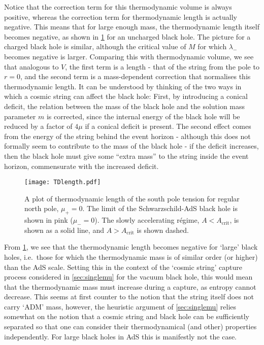 \documentclass[
twoside,
openright,
frontopenright,
]{dmathesis}
\newcommand{\todoopt}[2][]{\todo[color=blue!20,size=\footnotesize,#1]{#2}}
\begin{document}
Notice that the correction term for this thermodynamic volume is always
positive, whereas the correction term for thermodynamic length is actually
negative.  This means that for large enough mass, the thermodynamic length
itself becomes negative, as shown in \cref{fig:TDlength} for an uncharged black
hole. The picture for a charged black hole is similar, although the critical
value of $M$ for which $\lambda_-$ becomes negative is larger. Comparing this
with thermodynamic volume, we see that analogous to $V$, the first term is a
length - that of the string from the pole to $r=0$, and the second term is a
mass-dependent correction that normalises this thermodynamic length.  It can be
understood by thinking of the two ways in which a cosmic string can affect the
black hole: First, by introducing a conical deficit, the relation between the
mass of the black hole and the solution mass parameter $m$ is corrected, since
the internal energy of the black hole will be reduced by a factor of $4\mu$ if a
conical deficit is present.  The second effect comes from the energy of the
string behind the event horizon - although this does not formally seem to
contribute to the mass of the black hole - if the deficit increases, then the
black hole must give some ``extra mass'' to the string inside the event horizon,
commensurate with the increased deficit.\todoopt{correct figure}
\begin{figure}
  \centering
  \texttt{[image: TDlength.pdf]}
  \caption{\label{fig:TDlength}A plot of thermodynamic length of the south
    pole tension for regular north pole, $\mu_+=0$. The limit of the
    Schwarzschild-AdS black hole is shown in pink ($\mu_-=0$). The slowly
    accelerating r\'egime, $A<A_\mathrm{crit}$, is shown as a solid line, and
    $A>A_\mathrm{crit}$ is shown dashed.}
\end{figure}


From \cref{fig:TDlength}, we see that the thermodynamic length becomes negative
for `large' black holes, i.e.\ those for which the thermodynamic mass is of
similar order (or higher) than the AdS scale. Setting this in the context of the
`cosmic string' capture process considered in \cref{sec:singlemu} for the vacuum
black hole, this would mean that the thermodynamic mass must increase during a
capture, as entropy cannot decrease. This seems at first counter to the notion
that the string itself does not carry `ADM' mass, however, the heuristic
argument of \cref{sec:singlemu} relies somewhat on the notion that a cosmic
string and black hole can be sufficiently separated so that one can consider
their thermodynamical (and other) properties independently. For large black
holes in AdS this is manifestly not the case.
\end{document}
